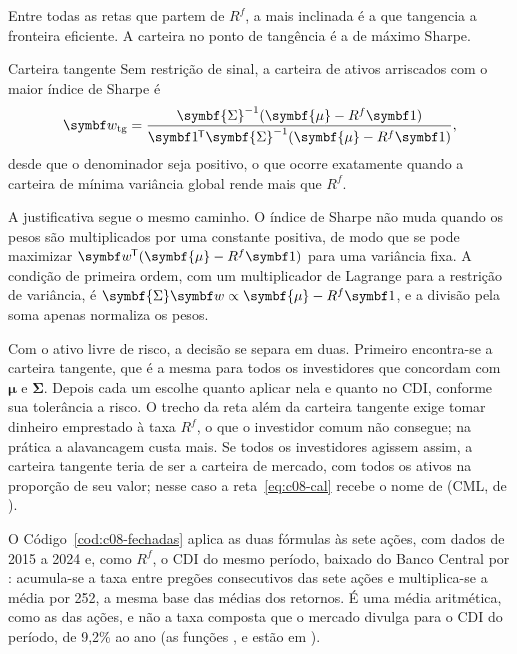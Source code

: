 Entre todas as retas que partem de $R^f$, a mais inclinada é a que tangencia a fronteira eficiente. A carteira no ponto de tangência é a de máximo Sharpe.

\begin{resultado}{Carteira tangente}
Sem restrição de sinal, a carteira de ativos arriscados com o maior índice de Sharpe é
\begin{equation}
  \vetor{w}_{\text{tg}} = \frac{\symbf{\Sigma}^{-1}(\symbf{\mu} - R^f\vetor{1})}{\vetor{1}\T\symbf{\Sigma}^{-1}(\symbf{\mu} - R^f\vetor{1})} ,
  \label{eq:c08-tg}
\end{equation}
desde que o denominador seja positivo, o que ocorre exatamente quando a carteira de mínima variância global rende mais que $R^f$.
\end{resultado}

A justificativa segue o mesmo caminho. O índice de Sharpe não muda quando os pesos são multiplicados por uma constante positiva, de modo que se pode maximizar $\vetor{w}\T(\symbf{\mu} - R^f\vetor{1})$ para uma variância fixa. A condição de primeira ordem, com um multiplicador de Lagrange para a restrição de variância, é $\symbf{\Sigma}\vetor{w} \propto \symbf{\mu} - R^f\vetor{1}$, e a divisão pela soma apenas normaliza os pesos.

Com o ativo livre de risco, a decisão se separa em duas. Primeiro encontra-se a carteira tangente, que é a mesma para todos os investidores que concordam com $\symbf{\mu}$ e $\symbf{\Sigma}$. Depois cada um escolhe quanto aplicar nela e quanto no CDI, conforme sua tolerância a risco. O trecho da reta além da carteira tangente exige tomar dinheiro emprestado à taxa $R^f$, o que o investidor comum não consegue; na prática a alavancagem custa mais. Se todos os investidores agissem assim, a carteira tangente teria de ser a carteira de mercado, com todos os ativos na proporção de seu valor; nesse caso a reta~\eqref{eq:c08-cal} recebe o nome de  (CML, de ).

O Código~\ref{cod:c08-fechadas} aplica as duas fórmulas às sete ações, com dados de 2015 a 2024 e, como $R^f$, o CDI do mesmo período, baixado do Banco Central por : acumula-se a taxa entre pregões consecutivos das sete ações e multiplica-se a média por 252, a mesma base das médias dos retornos. É uma média aritmética, como as das ações, e não a taxa composta que o mercado divulga para o CDI do período, de 9,2\% ao ano (as funções ,  e  estão em ).

